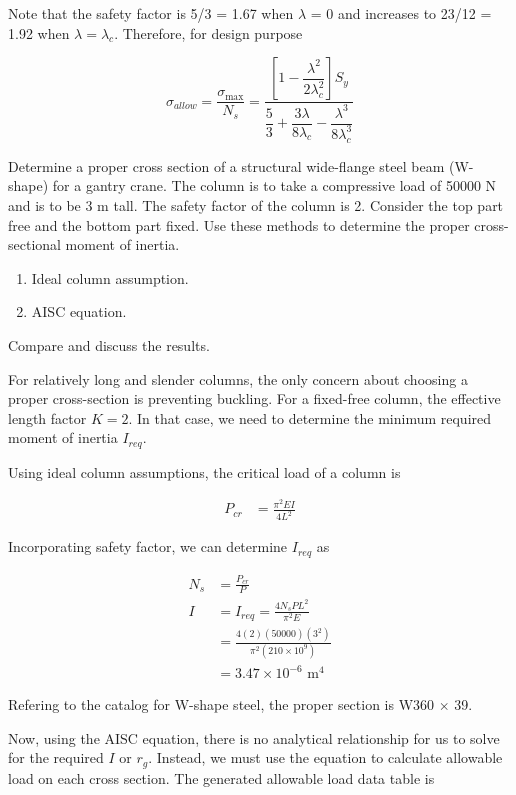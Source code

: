\documentclass[a4paper,openany,12pt]{book}
\begin{document}
{{\begin{enumerate}
Note that the safety factor is 5/3 = 1.67 when \(\lambda\) = 0 and
increases to 23/12 = 1.92 when \(\lambda = \lambda_c\). Therefore, for
design purpose

$$\sigma_{allow} = \frac{\sigma_{\max}}{N_s} = \frac{\left[ 1 - \dfrac{\lambda^2}{2\lambda_c^2} \right] S_y }{\dfrac{5}{3} + \dfrac{ 3\lambda }{8\lambda_c} - \dfrac{\lambda^3}{8\lambda_c^3}}$$


Determine a proper cross section of a structural wide-flange steel beam
(W-shape) for a gantry crane. The column is to take a compressive load
of 50000 N and is to be 3 m tall. The safety factor of the column is 2.
Consider the top part free and the bottom part fixed. Use these methods
to determine the proper cross-sectional moment of inertia.

\begin{enumerate}
\item Ideal column assumption.

\item AISC equation.
\end{enumerate}

Compare and discuss the results.

For relatively long and slender columns, the only concern about choosing
a proper cross-section is preventing buckling. For a fixed-free column,
the effective length factor \(K = 2\). In that case, we need to determine
the minimum required moment of inertia \(I_{req}\).

Using ideal column assumptions, the critical load of a column is

$$\begin{aligned}
    P_{cr} &= \frac{\pi^2 EI}{4L^2}
  \end{aligned}$$

Incorporating safety factor, we can determine \(I_{req}\) as

$$\begin{aligned}
    N_s &= \frac{P_{cr}}{P} \\
    I &= I_{req} = \frac{4 N_s P L^2}{\pi^2 E} \\
        &= \frac{4(2)(50000)(3^2)}{\pi^2 (210 \times 10^9)} \\
        &= 3.47 \times 10^{-6} \text{ m}^4
  \end{aligned}$$

Refering to the catalog for W-shape steel, the proper section is W360
\(\times\) 39.

Now, using the AISC equation, there is no analytical relationship for us
to solve for the required \(I\) or \(r_g\). Instead, we must use the
equation to calculate allowable load on each cross section. The
generated allowable load data table is


\end{enumerate}}}
\end{document}
